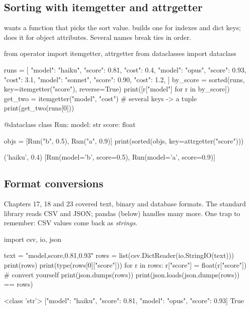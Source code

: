 \subsection{Sorting with itemgetter and attrgetter}

 wants a function that picks the sort value.  builds
one for indexes and dict keys;  does it for object attributes. Several names
break ties in order.

\begin{pycode}
from operator import itemgetter, attrgetter
from dataclasses import dataclass

runs = [
    {"model": "haiku", "score": 0.81, "cost": 0.4},
    {"model": "opus", "score": 0.93, "cost": 3.1},
    {"model": "sonnet", "score": 0.90, "cost": 1.2},
]
by_score = sorted(runs, key=itemgetter("score"), reverse=True)
print([r["model"] for r in by_score])
get_two = itemgetter("model", "cost")      # several keys -> a tuple
print(get_two(runs[0]))

@dataclass
class Run:
    model: str
    score: float

objs = [Run("b", 0.5), Run("a", 0.9)]
print(sorted(objs, key=attrgetter("score")))
\end{pycode}
\begin{rawcode}
('haiku', 0.4)
[Run(model='b', score=0.5), Run(model='a', score=0.9)]
\end{rawcode}

\subsection{Format conversions}

Chapters 17, 18 and 23 covered text, binary and database formats. The standard library reads CSV
and JSON; pandas (below) handles many more. One trap to remember: CSV values come back as
\emph{strings}.

\begin{pycode}
import csv, io, json

text = "model,score\nhaiku,0.81\nopus,0.93\n"
rows = list(csv.DictReader(io.StringIO(text)))
print(rows)
print(type(rows[0]["score"]))
for r in rows:
    r["score"] = float(r["score"])       # convert yourself
print(json.dumps(rows))
print(json.loads(json.dumps(rows)) == rows)
\end{pycode}
\begin{rawcode}
<class 'str'>
[{"model": "haiku", "score": 0.81}, {"model": "opus", "score": 0.93}]
True
\end{rawcode}

